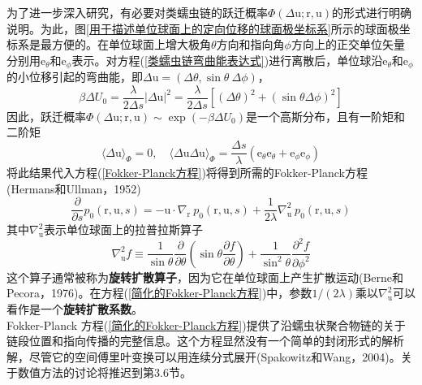 为了进一步深入研究，有必要对类蠕虫链的跃迁概率$\Phi(\Delta \mathrm{u};\mathrm{r},\mathrm{u})$的形式进行明确说明。为此，图\ref{用于描述单位球面上的定向位移的球面极坐标系}所示的球面极坐标系是最方便的。在单位球面上增大极角$\theta$方向和指向角$\phi$方向上的正交单位矢量分别用$\mathrm{e}_\theta$和$\mathrm{e}_\phi$表示。对方程(\ref{类蠕虫链弯曲能表达式})进行离散后，单位球沿$\mathrm{e}_\theta$和$\mathrm{e}_\phi$的小位移引起的弯曲能，即$\Delta \mathrm{u}=(\Delta \theta ,\sin \theta \ \Delta \phi)$，\\
\begin{equation}
\beta\Delta U_0 =\frac{\lambda}{2\Delta s}|\Delta \mathrm{u}|^2 =\frac{\lambda}{2\Delta s}[(\Delta\theta)^2+(\sin \theta \Delta \phi)^2]
\end{equation}
因此，跃迁概率$\Phi(\Delta \mathrm{u};\mathrm{r},\mathrm{u})\sim 
\exp(-\beta \Delta U_0)$是一个高斯分布，且有一阶矩和二阶矩\\
\begin{equation}
\langle \Delta \mathrm{u}\rangle_\Phi =0,\quad \langle \Delta \mathrm{u}\Delta \mathrm{u}\rangle_\Phi =\frac{\Delta s}{\lambda}(\mathrm{e}_\theta \mathrm{e}_\theta+\mathrm{e}_\phi \mathrm{e}_\phi)
\end{equation}
将此结果代入方程(\ref{Fokker-Planck方程})将得到所需的Fokker-Planck方程(Hermans和Ullman，1952)\\
\begin{equation}
	\frac{\partial}{\partial s}p_0(\mathrm{r},\mathrm{u},s) =-\mathrm{u} \cdot \nabla_\mathrm{r} \ p_0(\mathrm{r},\mathrm{u},s)+\frac{1}{2\lambda}\nabla_\mathrm{u}^2\  p_0(\mathrm{r},\mathrm{u},s)\label{简化的Fokker-Planck方程}
\end{equation}
其中$\nabla_\mathrm{u}^2$表示单位球面上的拉普拉斯算子\\
\begin{equation}
\nabla_\mathrm{u}^2 f \equiv \frac{1}{\sin\theta}\frac{\partial}{\partial\theta}\left(\sin\theta \frac{\partial f}{\partial \theta}\right)+\frac{1}{\sin^2\theta}\frac{\partial^2f}{\partial\phi^2}
\end{equation}
这个算子通常被称为\textbf{旋转扩散算子}，因为它在单位球面上产生扩散运动(Berne和Pecora，1976)。在方程(\ref{简化的Fokker-Planck方程})中，参数$1/(2\lambda)$乘以$\nabla_\mathrm{u}^2$可以看作是一个\textbf{旋转扩散系数}。\\

Fokker-Planck 方程(\ref{简化的Fokker-Planck方程})提供了沿蠕虫状聚合物链的关于链段位置和指向传播的完整信息。这个方程显然没有一个简单的封闭形式的解析解，尽管它的空间傅里叶变换可以用连续分式展开(Spakowitz和Wang，2004)。关于数值方法的讨论将推迟到第3.6节。\\

